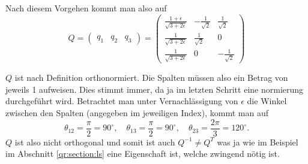 Nach diesem Vorgehen kommt man also auf
\begin{equation}
Q=
\begin{pmatrix}
q_1&q_2&q_3
\end{pmatrix}=
\begin{pmatrix}
\frac{1+\epsilon}{\sqrt{3+2\epsilon}}&-\frac{1}{\sqrt{2}}&\frac{1}{\sqrt{2}}\\
\frac{1}{\sqrt{3+2\epsilon}}&\frac{1}{\sqrt{2}}&0\\
\frac{1}{\sqrt{3+2\epsilon}}&0&-\frac{1}{\sqrt{2}}
\end{pmatrix}\label{qr:qsol}
\end{equation}

$Q$ ist nach Definition orthonormiert. Die Spalten müssen also ein Betrag von jeweils 1 aufweisen. 
Dies stimmt immer, da ja im letzten Schritt eine normierung durchgeführt wird.
Betrachtet man unter Vernachlässigung von $\epsilon$ die Winkel zwischen den Spalten (angegeben im jeweiligen Index), kommt man auf
\begin{equation*}
\theta_{12}=\frac{\pi}{2}=90^\circ,\quad \theta_{13}=\frac{\pi}{2}=90^\circ, \quad \theta_{23}=\frac{2\pi}{3}=120^\circ.
\end{equation*}
$Q$ ist also nicht orthogonal und somit ist auch $Q^{-1}\ne Q^T$ was ja wie im Beispiel im Abschnitt \ref{qr:section:ls} eine Eigenschaft ist, welche zwingend nötig ist.

